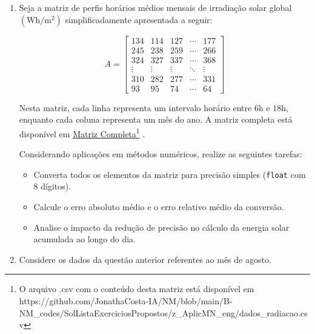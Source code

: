 \begin{enumerate}[label=\thesection.\arabic*]

\item Seja a matriz de perfis horários médios mensais de irradiação solar global \((\mathrm{Wh/m^2})\) simplificadamente apresentada a seguir:

\small{
\[A =
\begin{bmatrix}
134 & 114 & 127 & \cdots & 177 \\
245 & 238 & 259 & \cdots & 266 \\
324 & 327 & 337 & \cdots & 368 \\
\vdots & \vdots & \vdots & \ddots & \vdots \\
310 & 282 & 277 & \cdots & 331 \\
93 & 95 & 74 & \cdots & 64
\end{bmatrix}
\]}

Nesta matriz, cada linha representa um intervalo horário entre \(6\mathrm{h}\) e \(18\mathrm{h}\), enquanto cada coluna representa um mês do ano.
A matriz completa está disponível em 
\href{https://github.com/JonathaCosta-IA/NM/blob/main/B-NM_codes/SolListaExerciciosPropostos/z_AplicMN_eng/dados_radiacao.csv}
{Matriz Completa\footnote
{O arquivo .csv com o conteúdo desta matriz está disponível em
\url{https://github.com/JonathaCosta-IA/NM/blob/main/B-NM_codes/SolListaExerciciosPropostos/z_AplicMN_eng/dados_radiacao.csv}
}
}.


Considerando aplicações em métodos numéricos, realize as seguintes tarefas:

\begin{itemize}

\item Converta todos os elementos da matriz para precisão simples (\texttt{float} com 8 dígitos).

\item Calcule o erro absoluto médio e o erro relativo médio da conversão.

\item Analise o impacto da redução de precisão no cálculo da energia solar acumulada ao longo do dia.

\end{itemize}


\item Considere os dados da questão anterior referentes ao mês de agosto.


\end{enumerate}

